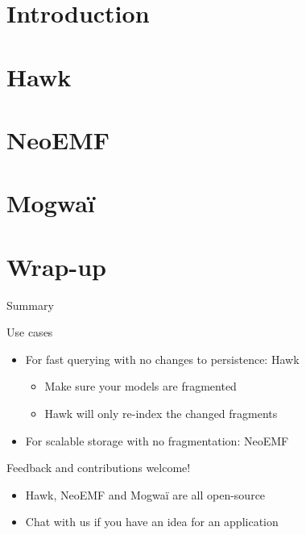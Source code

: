 



\maketitle

\section{Introduction}
\section{Hawk}
\section{NeoEMF}
\section{Mogwa\"i}

\section{Wrap-up}

\begin{frame}{Summary}

  \begin{block}{Use cases}
    \begin{itemize}
    \item For fast querying with no changes to persistence: Hawk
    \begin{itemize}
    \item Make sure your models are fragmented
    \item Hawk will only re-index the changed fragments
    \end{itemize}
    \item For scalable storage with no fragmentation: NeoEMF
    \end{itemize}
  \end{block}

  \begin{block}{Feedback and contributions welcome!}
  \begin{itemize}
  \item Hawk, NeoEMF and Mogwaï are all open-source
  \item Chat with us if you have an idea for an application
  \end{itemize}
  \end{block}

\end{frame}

